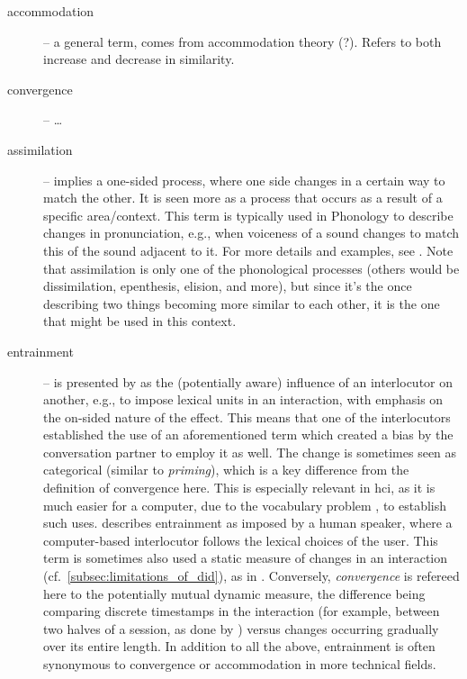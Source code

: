 \begin{description}
	\item[accommodation] -- a general term, comes from accommodation theory (?).
	Refers to both increase and decrease in similarity.
	
	\item[convergence] -- \ldots
	
	\item[assimilation] -- implies a one-sided process, where one side changes in a certain way to match the other.
	It is seen more as a process that occurs as a result of a specific area/context.
	This term is typically used in Phonology to describe changes in pronunciation, e.g., when voiceness of a sound changes to match this of the sound adjacent to it.
	For more details and examples, see \cite[][Section 3.3, pp.\ 89-98]{Hall2011phonologie}.
	Note that assimilation is only one of the phonological processes (others would be dissimilation, epenthesis, elision, and more), but since it's the once describing two things becoming more similar to each other, it is the one that might be used in this context.
	
	\item[entrainment] -- is presented by \citet{Brennan1996lexical} as the (potentially aware) influence of an interlocutor on another, e.g., to impose lexical units in an interaction, with emphasis on the on-sided nature of the effect.
	This means that one of the interlocutors established the use of an aforementioned term which created a bias by the conversation partner to employ it as well.
	The change is sometimes seen as categorical (similar to \textit{priming}), which is a key difference from the definition of convergence here.
	This is especially relevant in \ac{hci}, as it is much easier for a computer, due to the vocabulary problem \citep{Furnas1987vocabulary}, to establish such uses.
	\citet{Lopes2013automated} describes entrainment as imposed by a human speaker, where a computer-based interlocutor follows the lexical choices of the user.
	This term is sometimes also used a static measure of changes in an interaction (cf.\ \cref{subsec:limitations_of_did}), as in \citet{Levitan2013entrainment}.
	Conversely, \emph{convergence} is refereed here to the potentially mutual dynamic measure, the difference being comparing discrete timestamps in the interaction (for example, between two halves of a session, as done by \citet{Xia2014prosodic}) versus changes occurring gradually over its entire length.
	In addition to all the above, entrainment is often synonymous to convergence or accommodation in more technical fields.
	

\end{description}
